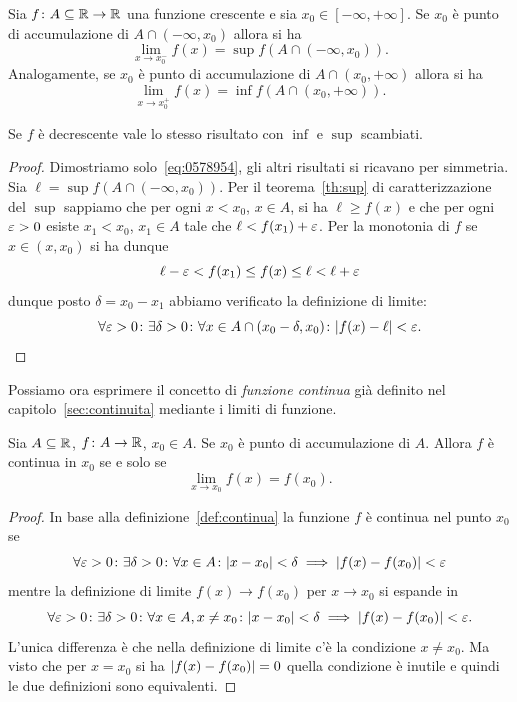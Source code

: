 \begin{theorem}
Sia $f\colon A \subseteq \mathbb R \to \mathbb R$ una funzione crescente
e sia $x_0 \in [-\infty, +\infty]$. Se $x_0$ è punto di accumulazione di $A \cap (-\infty,x_0)$ allora si ha
\begin{equation}\label{eq:0578954}
  \lim_{x \to x_0^-} f(x) = \sup f(A\cap (-\infty,x_0)).
\end{equation}
Analogamente, se $x_0$ è punto di accumulazione
di $A \cap (x_0,+\infty)$ allora si ha
\begin{equation}\label{eq:0578955}
  \lim_{x \to x_0^+} f(x) = \inf f(A\cap(x_0,+\infty)).
\end{equation}

Se $f$ è decrescente vale lo stesso risultato con $\inf$ e $\sup$ scambiati.
\end{theorem}
%
\begin{proof}
Dimostriamo solo~\eqref{eq:0578954}, gli altri risultati si ricavano per simmetria.
Sia $\ell = \sup f(A \cap (-\infty,x_0))$.
Per il teorema~\ref{th:sup} di caratterizzazione del $\sup$ sappiamo che per ogni $x<x_0$, $x\in A$, si ha $\ell \ge f(x)$ e che per ogni $\varepsilon>0$ esiste $x_1<x_0$, $x_1\in A$ tale che $\ell < f(x_1) + \varepsilon$.
Per la monotonia di $f$ se $x \in(x,x_0)$ si ha dunque
\[
  \ell- \varepsilon < f(x_1) \le f(x) \le \ell < \ell+\varepsilon
\]
dunque posto $\delta = x_0 - x_1$ abbiamo verificato la definizione di limite:
\[
 \forall \varepsilon>0\colon \exists \delta>0 \colon \forall x\in A \cap (x_0-\delta, x_0)\colon {\left|f(x)-\ell\right|}< \varepsilon.
\]
\end{proof}

Possiamo ora esprimere il concetto di \emph{funzione continua} già definito
nel capitolo~\ref{sec:continuita} mediante i limiti di funzione.

\begin{theorem}
\mymark{***}
Sia $A\subseteq \mathbb R$, $f\colon A \to \mathbb R$, $x_0 \in A$. Se $x_0$ è punto di
accumulazione di $A$.
Allora $f$ è continua in $x_0$ se e solo se
\[
  \lim_{x\to x_0}f(x) = f(x_0).
\]
\end{theorem}

\begin{proof}
In base alla definizione~\ref{def:continua} la funzione $f$ è continua nel
punto $x_0$ se
\[
 \forall \varepsilon>0 \colon \exists \delta >0 \colon
 \forall x \in A\colon
 {\left|x-x_0\right|}<\delta \implies {\left|f(x)-f(x_0)\right|} < \varepsilon
\]
mentre la definizione di limite $f(x)\to f(x_0)$ per $x\to x_0$
si espande in
\[
\forall \varepsilon>0 \colon \exists \delta>0\colon
\forall x \in A, x\neq x_0\colon
{\left|x-x_0\right|}<\delta \implies {\left|f(x)-f(x_0)\right|} < \varepsilon.
\]
L'unica differenza è che nella definizione di limite
c'è la condizione $x\neq x_0$. Ma visto che per $x=x_0$
si ha ${\left|f(x)-f(x_0)\right|}=0$ quella condizione è inutile e quindi
le due definizioni sono equivalenti.
\end{proof}

